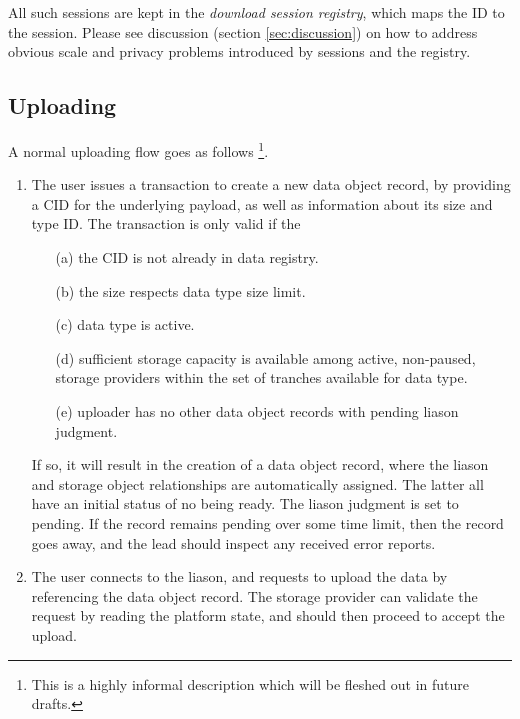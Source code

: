 \documentclass{article}
\begin{document}
All such sessions are kept in the \textit{download session registry}, which maps the ID to the session. Please see discussion (section \ref{sec:discussion}) on how to address obvious scale and privacy problems introduced by sessions and the registry.

\subsection{Uploading} \label{sec:data_storage_and_distribution:uploading}

A normal uploading flow goes as follows \footnote{This is a highly informal description which will be fleshed out in future drafts.}.

\begin{enumerate}

\item
The user issues a transaction to create a new data object record, by providing a CID for the underlying payload, as well as information about its size and type ID. The transaction is only valid if the

      \begin{itemize}

          \item[(a)] the CID is not already in data registry.

          \item[(b)] the size respects data type size limit.

          \item[(c)] data type is active.

          \item[(d)] sufficient storage capacity is available among active, non-paused, storage providers within the set of tranches available for data type.

          \item[(e)] uploader has no other data object records with pending liason judgment.

      \end{itemize}

If so, it will result in the creation of a data object record, where the liason and storage object relationships are automatically assigned. The latter all have an initial status of no being ready. The liason judgment is set to pending. If the record remains pending over some time limit, then the record goes away, and the lead should inspect any received error reports.

\item
The user connects to the liason, and requests to upload the data by referencing the data object record. The storage provider can validate the request by reading the platform state, and should then proceed to accept the upload.


\end{enumerate}
\end{document}
